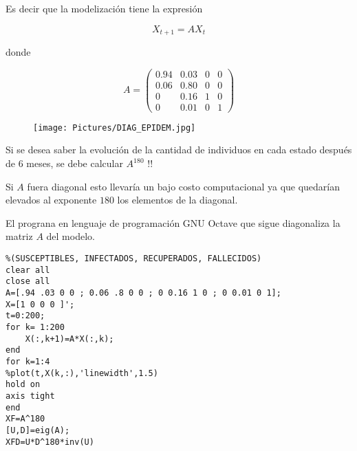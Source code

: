 \bigskip


Es decir que la modelización tiene la expresión


$$X_{t+1}= AX_{t}    $$

\noindent
donde 

$$A=\left(\begin{array}{cccc}  0.94  & 0.03  & 0 & 0  \\ 0.06 &  0.80 & 0 &  0 \\ 0 & 0.16 & 1 & 0 \\0 & 0.01 &  0  & 1
\end{array}
 \right)$$

\bigskip



\begin{figure}[ht]
	\centering
			\texttt{[image: Pictures/DIAG\_EPIDEM.jpg]}
 \end{figure}

\bigskip

Si se desea saber la evolución de la cantidad de individuos en cada estado después de 6 meses, se debe calcular $A^{180}$ !! 

Si $A$ fuera diagonal esto llevaría un  bajo costo computacional ya que quedarían elevados al exponente $180$  los elementos de la diagonal.



\bigskip

El prograna en lenguaje de programación GNU Octave que sigue diagonaliza la matriz $A$ del modelo. 


\bigskip



\begin{lstlisting}[frame=single]
% MODELO SIRD 
%(SUSCEPTIBLES, INFECTADOS, RECUPERADOS, FALLECIDOS)
clear all
close all
A=[.94 .03 0 0 ; 0.06 .8 0 0 ; 0 0.16 1 0 ; 0 0.01 0 1];
X=[1 0 0 0 ]';
t=0:200;
for k= 1:200
    X(:,k+1)=A*X(:,k);
end
for k=1:4
%plot(t,X(k,:),'linewidth',1.5)
hold on
axis tight
end
XF=A^180
[U,D]=eig(A);
XFD=U*D^180*inv(U)
\end{lstlisting}

